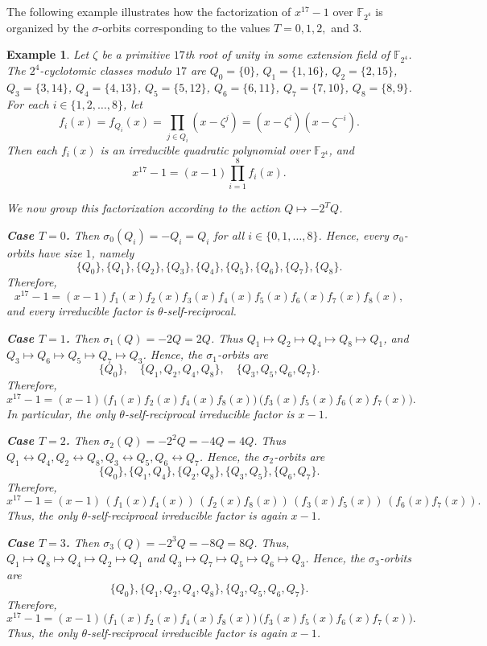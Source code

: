 \documentclass[pdflatex,sn-mathphys-num]{sn-jnl}%
\theoremstyle{thmstyleone}%
\theoremstyle{thmstyletwo}%
\newtheorem{example}{Example}%
\theoremstyle{thmstylethree}%
\newcommand{\F}{\mathbb{F}}
\begin{document}
The following example illustrates how the factorization of $x^{17}-1$ over $\F_{2^4}$ is organized by the $\sigma$-orbits corresponding to the values $T=0,1,2,$ and $3$.
\begin{example}\label{ex:x17minus1-F16}
Let $\zeta$ be a primitive $17$th root of unity  in some extension field of  $\F_{2^4}$. The $2^4$-cyclotomic classes modulo $17$ are
$
Q_0=\{0\}$, $
Q_1=\{1,16\}$,
$
Q_2=\{2,15\}$,
$
Q_3=\{3,14\}$,
$
Q_4=\{4,13\}$,
$
Q_5=\{5,12\}$,
$
Q_6=\{6,11\}$,
$
Q_7=\{7,10\}$,
$
Q_8=\{8,9\}$.
For each $i\in\{1,2,\dots,8\}$, let
\[
f_i(x)=f_{Q_i}(x)=\prod_{j\in Q_i}(x-\zeta^j)
=(x-\zeta^i)(x-\zeta^{-i}).
\]
Then each $f_i(x)$ is an irreducible quadratic polynomial over $\F_{2^4}$, and
\[
x^{17}-1=(x-1)\prod_{i=1}^8 f_i(x).
\]

We now group this factorization according to the action
$
Q\longmapsto -2^TQ$.

\noindent
\textbf{Case $T=0$.}
Then $
\sigma_0(Q_i)=-Q_i=Q_i$ for all $i\in \{0,1,\dots,8\}$.  Hence,  every  $\sigma_0$-orbits have size $1$, namely
\[
\{Q_0\},\{Q_1\},\{Q_2\},\{Q_3\},\{Q_4\},\{Q_5\},\{Q_6\},\{Q_7\},\{Q_8\}.
\]
Therefore,
\[
x^{17}-1=(x-1)f_1(x)f_2(x)f_3(x)f_4(x)f_5(x)f_6(x)f_7(x)f_8(x),
\]
and every irreducible factor is $\theta$-self-reciprocal.

 
\noindent
\textbf{Case $T=1$.} Then 
$
\sigma_1(Q)=-2Q=2Q$. Thus
$
Q_1\mapsto Q_2\mapsto Q_4\mapsto Q_8\mapsto Q_1$,
and
$
Q_3\mapsto Q_6\mapsto Q_5\mapsto Q_7\mapsto Q_3$.
Hence, the $\sigma_1$-orbits are
\[
\{Q_0\},\quad \{Q_1,Q_2,Q_4,Q_8\},\quad \{Q_3,Q_5,Q_6,Q_7\}.
\]
Therefore,
\[
x^{17}-1
=
(x-1)\,
\bigl(f_1(x)f_2(x)f_4(x)f_8(x)\bigr)\,
\bigl(f_3(x)f_5(x)f_6(x)f_7(x)\bigr).
\]
In particular, the only $\theta$-self-reciprocal irreducible factor is $x-1$.

 
\noindent
\textbf{Case $T=2$.}
Then $
\sigma_2(Q)=-2^2Q=-4Q=4Q$.
Thus
$
Q_1\leftrightarrow Q_4, 
Q_2\leftrightarrow Q_8, 
Q_3\leftrightarrow Q_5, 
Q_6\leftrightarrow Q_7$.
Hence,  the $\sigma_2$-orbits are
\[
\{Q_0\},\{Q_1,Q_4\}, \{Q_2,Q_8\},
\{Q_3,Q_5\}, \{Q_6,Q_7\}.
\]
Therefore,
\[
x^{17}-1
=
(x-1)\,
\left(f_1(x)f_4(x)\right)\,\left(
f_2(x)f_8(x)\right)\, \left(
f_3(x)f_5(x)\right)\,
\left(f_6(x)f_7(x)\right).
\]
Thus,   the only $\theta$-self-reciprocal irreducible factor is again $x-1$.

 
\noindent
\textbf{Case $T=3$.}
Then 
$
\sigma_3(Q)=-2^3Q=-8Q=8Q$.
Thus,
$
Q_1\mapsto Q_8\mapsto Q_4\mapsto Q_2\mapsto Q_1$ 
and
$
Q_3\mapsto Q_7\mapsto Q_5\mapsto Q_6\mapsto Q_3$.
Hence, the $\sigma_3$-orbits are
\[
\{Q_0\}, \{Q_1,Q_2,Q_4,Q_8\}, \{Q_3,Q_5,Q_6,Q_7\}.
\]
Therefore,
\[
x^{17}-1
=
(x-1)\,
\bigl(f_1(x)f_2(x)f_4(x)f_8(x)\bigr)\,
\bigl(f_3(x)f_5(x)f_6(x)f_7(x)\bigr).
\]
Thus, the only $\theta$-self-reciprocal irreducible factor is again $x-1$.
\end{example}
\end{document}
